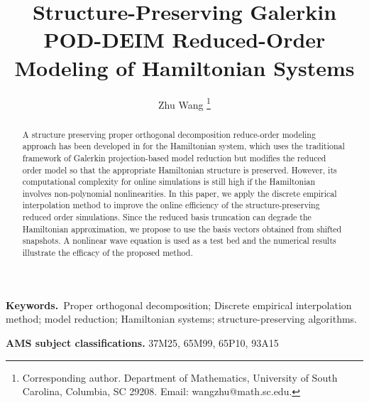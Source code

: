 \documentclass[11pt]{article}
\title{Structure-Preserving Galerkin POD-DEIM Reduced-Order Modeling of Hamiltonian Systems}
\author{Zhu Wang \thanks{ Corresponding author.
           Department of Mathematics, University of South Carolina, Columbia, SC 29208.
           Email: {wangzhu@math.sc.edu}. }
}
\date{}
\newcounter{example}
\begin{document}
\maketitle
\begin{abstract}
A structure preserving proper orthogonal decomposition reduce-order modeling approach has been developed in \cite{gong2017structure} for the Hamiltonian system, which uses the traditional framework of Galerkin projection-based model reduction but modifies the reduced order model so that the appropriate Hamiltonian structure is preserved. However, its computational complexity for online simulations is still high if the Hamiltonian involves non-polynomial nonlinearities. In this paper, we apply the discrete empirical interpolation method to improve the online efficiency of the structure-preserving reduced order simulations. Since the reduced basis truncation can degrade the Hamiltonian approximation, we propose to use the basis vectors obtained from shifted snapshots. 
A nonlinear wave equation is used as a test bed and the numerical results illustrate the efficacy of the proposed method. 
\end{abstract}

{\bf Keywords.}~Proper orthogonal decomposition; Discrete empirical interpolation method; model reduction; Hamiltonian systems; structure-preserving algorithms.

 {\bf AMS subject classifications.} 37M25, 65M99, 65P10, 93A15


\end{document}
